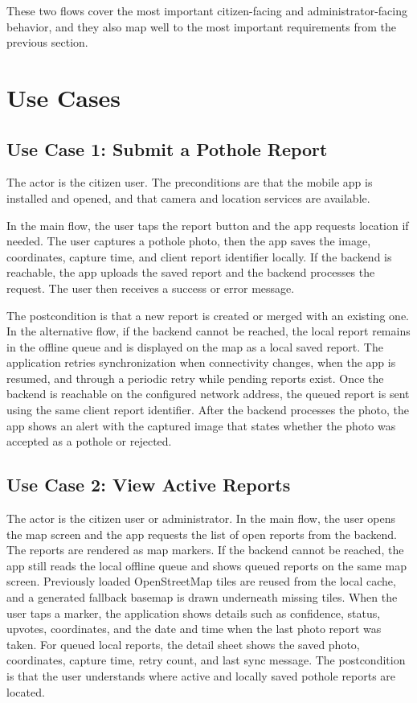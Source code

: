 These two flows cover the most important citizen-facing and administrator-facing behavior, and they also map well to the most important requirements from the previous section.

\section{Use Cases}

\subsection{Use Case 1: Submit a Pothole Report}

The actor is the citizen user. The preconditions are that the mobile app is installed and opened, and that camera and location services are available.

In the main flow, the user taps the report button and the app requests location if needed. The user captures a pothole photo, then the app saves the image, coordinates, capture time, and client report identifier locally. If the backend is reachable, the app uploads the saved report and the backend processes the request. The user then receives a success or error message.

The postcondition is that a new report is created or merged with an existing one. In the alternative flow, if the backend cannot be reached, the local report remains in the offline queue and is displayed on the map as a local saved report. The application retries synchronization when connectivity changes, when the app is resumed, and through a periodic retry while pending reports exist. Once the backend is reachable on the configured network address, the queued report is sent using the same client report identifier. After the backend processes the photo, the app shows an alert with the captured image that states whether the photo was accepted as a pothole or rejected.

\subsection{Use Case 2: View Active Reports}

The actor is the citizen user or administrator. In the main flow, the user opens the map screen and the app requests the list of open reports from the backend. The reports are rendered as map markers. If the backend cannot be reached, the app still reads the local offline queue and shows queued reports on the same map screen. Previously loaded OpenStreetMap tiles are reused from the local cache, and a generated fallback basemap is drawn underneath missing tiles. When the user taps a marker, the application shows details such as confidence, status, upvotes, coordinates, and the date and time when the last photo report was taken. For queued local reports, the detail sheet shows the saved photo, coordinates, capture time, retry count, and last sync message. The postcondition is that the user understands where active and locally saved pothole reports are located.

